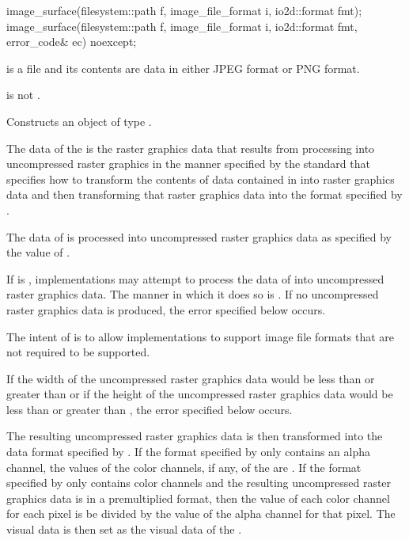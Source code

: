 %
\begin{itemdecl}
image_surface(filesystem::path f, image_file_format i,
  io2d::format fmt);
image_surface(filesystem::path f, image_file_format i,
  io2d::format fmt, error_code& ec) noexcept;
\end{itemdecl}
\begin{itemdescr}
\pnum
\requires
{} is a file and its contents are data in either JPEG format or PNG format.

\pnum
{} is not .

\pnum
\effects
Constructs an object of type .

\pnum
The data of the \underlyingimagesurface is the raster graphics data that results from processing  into uncompressed raster graphics in the manner specified by the standard that specifies how to transform the contents of data contained in  into raster graphics data and then transforming that raster graphics data into the format specified by .

\pnum
The data of  is processed into uncompressed raster graphics data as specified by the value of .

\pnum
If  is , implementations may attempt to process the data of  into uncompressed raster graphics data. The manner in which it does so is \unspecnorm. If no uncompressed raster graphics data is produced, the error specified below occurs.

\pnum
\begin{note}
The intent of  is to allow implementations to support image file formats that are not required to be supported.
\end{note}

\pnum
If the width of the uncompressed raster graphics data would be less than  or greater than  or if the height of the uncompressed raster graphics data would be less than  or greater than , the error specified below occurs.

\pnum
The resulting uncompressed raster graphics data is then transformed into the data format specified by . If the format specified by  only contains an alpha channel, the values of the color channels, if any, of the \underlyingimagesurface are \unspecnorm. If the format specified by  only contains color channels and the resulting uncompressed raster graphics data is in a premultiplied format, then the value of each color channel for each pixel is be divided by the value of the alpha channel for that pixel. The visual data is then set as the visual data of the \underlyingimagesurface.


\end{itemdescr}

